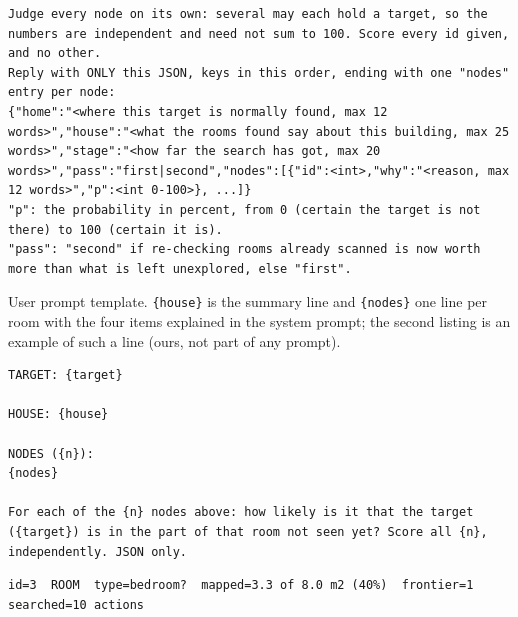 \documentclass[10pt]{article}
\newcommand{\code}[1]{\texttt{#1}}
\begin{document}
\begin{lstlisting}[style=prompt]
Judge every node on its own: several may each hold a target, so the numbers are independent and need not sum to 100. Score every id given, and no other.
Reply with ONLY this JSON, keys in this order, ending with one "nodes" entry per node:
{"home":"<where this target is normally found, max 12 words>","house":"<what the rooms found say about this building, max 25 words>","stage":"<how far the search has got, max 20 words>","pass":"first|second","nodes":[{"id":<int>,"why":"<reason, max 12 words>","p":<int 0-100>}, ...]}
"p": the probability in percent, from 0 (certain the target is not there) to 100 (certain it is).
"pass": "second" if re-checking rooms already scanned is now worth more than what is left unexplored, else "first".
\end{lstlisting}
User prompt template. \code{\{house\}} is the summary line and
\code{\{nodes\}} one line per room with the four items explained in the system
prompt; the second listing is an example of such a line (ours, not part of any
prompt).
\begin{lstlisting}[style=prompt]
TARGET: {target}

HOUSE: {house}

NODES ({n}):
{nodes}

For each of the {n} nodes above: how likely is it that the target ({target}) is in the part of that room not seen yet? Score all {n}, independently. JSON only.
\end{lstlisting}
\begin{lstlisting}[style=prompt]
id=3  ROOM  type=bedroom?  mapped=3.3 of 8.0 m2 (40%)  frontier=1  searched=10 actions
\end{lstlisting}
\end{document}
